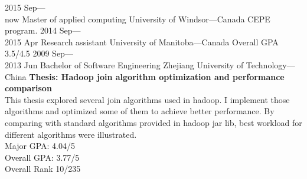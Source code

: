 \documentclass[]{friggeri-cv} %
\begin{document}
\begin{entrylist}
\entry
{2015 Sep--- \\ now}
{Master {\normalfont of applied computing}}
{University of Windsor---Canada}
{ CEPE program.
}
\entry
{2014 Sep--- \\ 2015 Apr}
{Research assistant}
{University of Manitoba---Canada}
{	Overall GPA 3.5/4.5
}
\entry
{2009 Sep--- \\ 2013 Jun}
{Bachelor {\normalfont of Software Engineering}}
{Zhejiang University of Technology---China}
{\textbf{Thesis: Hadoop join algorithm optimization and performance comparison} \\ This thesis explored several join algorithms used in hadoop. I implement those algorithms and optimized some of them to achieve better performance. By comparing with standard algorithms provided in hadoop jar lib, best workload for different algorithms were illustrated.\\
	Major GPA: 4.04/5\\ 	
	Overall GPA: 3.77/5\\
	Overall Rank 10/235
}
\end{entrylist}
\end{document}
